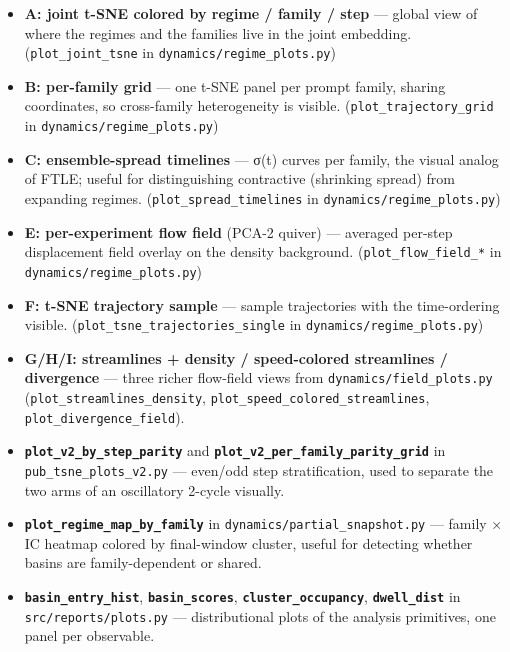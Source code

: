 \documentclass{article}
\theoremstyle{plain}
\theoremstyle{definition}
\begin{document}
\begin{itemize}
  \item \textbf{A: joint t-SNE colored by regime / family / step} — global view of
  where the regimes and the families live in the joint embedding.
  (\texttt{plot\_joint\_tsne} in \texttt{dynamics/regime\_plots.py})
  \item \textbf{B: per-family grid} — one t-SNE panel per prompt family, sharing
  coordinates, so cross-family heterogeneity is visible.
  (\texttt{plot\_trajectory\_grid} in \texttt{dynamics/regime\_plots.py})
  \item \textbf{C: ensemble-spread timelines} — σ(t) curves per family, the visual
  analog of FTLE; useful for distinguishing contractive (shrinking spread)
  from expanding regimes. (\texttt{plot\_spread\_timelines} in
  \texttt{dynamics/regime\_plots.py})
  \item \textbf{E: per-experiment flow field} (PCA-2 quiver) — averaged per-step
  displacement field overlay on the density background.
  (\texttt{plot\_flow\_field\_*} in \texttt{dynamics/regime\_plots.py})
  \item \textbf{F: t-SNE trajectory sample} — sample trajectories with the
  time-ordering visible. (\texttt{plot\_tsne\_trajectories\_single} in
  \texttt{dynamics/regime\_plots.py})
  \item \textbf{G/H/I: streamlines + density / speed-colored streamlines / divergence}
  — three richer flow-field views from \texttt{dynamics/field\_plots.py}
  (\texttt{plot\_streamlines\_density}, \texttt{plot\_speed\_colored\_streamlines},
  \texttt{plot\_divergence\_field}).
  \item \textbf{\texttt{plot\_v2\_by\_step\_parity}} and \textbf{\texttt{plot\_v2\_per\_family\_parity\_grid}}
  in \texttt{pub\_tsne\_plots\_v2.py} — even/odd step stratification, used to
  separate the two arms of an oscillatory 2-cycle visually.
  \item \textbf{\texttt{plot\_regime\_map\_by\_family}} in \texttt{dynamics/partial\_snapshot.py} —
  family × IC heatmap colored by final-window cluster, useful for
  detecting whether basins are family-dependent or shared.
  \item \textbf{\texttt{basin\_entry\_hist}}, \textbf{\texttt{basin\_scores}}, \textbf{\texttt{cluster\_occupancy}},
  \textbf{\texttt{dwell\_dist}} in \texttt{src/reports/plots.py} — distributional plots of
  the analysis primitives, one panel per observable.
\end{itemize}
\end{document}
